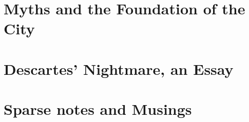 \documentclass[a4paper,12pt,twoside]{book}
\begin{document}
\chapter{Myths and the Foundation of the City}




\chapter{Descartes' Nightmare, an Essay}


\chapter{Sparse notes and Musings}



































\end{document}
